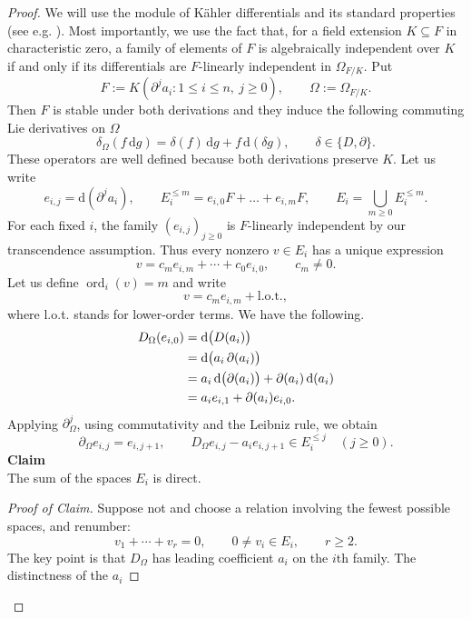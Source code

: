 \documentclass[11pt,a4paper]{amsart}
\theoremstyle{definition}
\newcommand{\ord}{\operatorname{ord}}
\newcommand{\dd}{\mathrm d}
\begin{document}
\begin{proof}
We will use the module of K\"{a}hler differentials and its standard properties (see e.g. \cite{Stacks}). Most importantly, we use the fact that, for a field extension $K\subseteq F$ in characteristic zero, a family of
elements of $F$ is algebraically independent over $K$ if
and only if its differentials are $F$-linearly independent
in $\Omega_{F/K}$. Put
\[
 F:=K(\partial^j a_i:1\leqslant i\leqslant n,\ j\geqslant0),
 \qquad \Omega:=\Omega_{F/K}.
\]
Then $F$ is stable under both
derivations and they induce the following commuting Lie derivatives on $\Omega$
\[
 \delta_\Omega(f\,\dd g)
 =\delta(f)\,\dd g+f\,\dd(\delta g),
 \qquad \delta\in\{D,\partial\}.
\]
These operators are well defined because both derivations preserve $K$. Let us write
\[
 e_{i,j}=\dd(\partial^j a_i),\qquad
 E_i^{\leqslant m}=e_{i,0}F+\ldots+e_{i,m}F,\qquad
 E_i=\bigcup_{m\geqslant0}E_i^{\leqslant m}.
\]
For each fixed $i$, the family $(e_{i,j})_{j\geqslant0}$ is $F$-linearly
independent by our transcendence assumption. Thus every nonzero $v\in E_i$ has a unique expression
\[
 v=c_m e_{i,m}+\cdots+c_0e_{i,0},\qquad c_m\neq0.
\]
Let us define $\ord_i(v)=m$ and write
\[
v=c_me_{i,m}+\text{l.o.t.},
\]
where l.o.t. stands for lower-order terms.
We have the following.
\begin{align}
D_\Omega(e_{i,0})
  &= \dd\bigl(D(a_i)\bigr) \notag\\
  &= \dd\bigl(a_i\,\partial(a_i)\bigr) \notag\\
  &= a_i\,\dd\bigl(\partial(a_i)\bigr)
     + \partial(a_i)\,\dd(a_i) \notag\\
  &= a_i e_{i,1} + \partial(a_i)e_{i,0} \notag.
\end{align}
Applying $\partial_\Omega^j$, using commutativity and the Leibniz rule,
we obtain
\begin{equation}\label{leading}
 \partial_\Omega e_{i,j}=e_{i,j+1},\qquad
 D_\Omega e_{i,j}-a_i e_{i,j+1}\in E_i^{\leqslant j}
 \quad(j\geqslant0).
\end{equation}
{\bf Claim}
\\
The sum of the spaces $E_i$ is direct.
\begin{proof}[Proof of Claim]
Suppose not and choose a
relation involving the fewest possible spaces, and renumber:
\begin{equation}\label{minimal}
 v_1+\cdots+v_r=0,\qquad
 0\neq v_i\in E_i,\qquad r\geqslant2.
\end{equation}
The key point is that $D_\Omega$ has leading coefficient
$a_i$ on the $i$th family. The distinctness of the $a_i$

\end{proof}
\end{proof}
\end{document}
